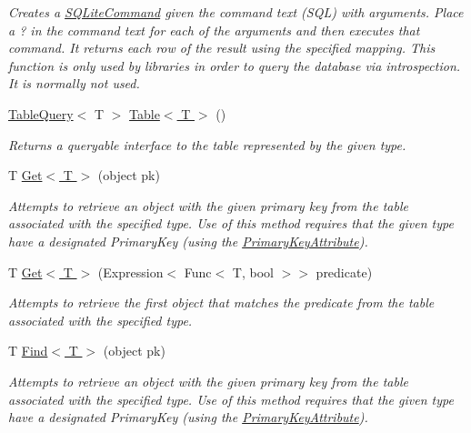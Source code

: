 \begin{DoxyCompactItemize}
\begin{DoxyCompactList}\small\item\em Creates a \hyperlink{classSQLite_1_1SQLiteCommand}{S\+Q\+Lite\+Command} given the command text (S\+Q\+L) with arguments. Place a \textquotesingle{}?\textquotesingle{} in the command text for each of the arguments and then executes that command. It returns each row of the result using the specified mapping. This function is only used by libraries in order to query the database via introspection. It is normally not used. \end{DoxyCompactList}\item 
\hyperlink{classSQLite_1_1TableQuery}{Table\+Query}$<$ T $>$ \hyperlink{classSQLite_1_1SQLiteConnection_ab44d5100216c3cdcea76e45c6f7d6246}{Table$<$ T $>$} ()
\begin{DoxyCompactList}\small\item\em Returns a queryable interface to the table represented by the given type. \end{DoxyCompactList}\item 
T \hyperlink{classSQLite_1_1SQLiteConnection_a17fdec8364635853d573e84530e1ab48}{Get$<$ T $>$} (object pk)
\begin{DoxyCompactList}\small\item\em Attempts to retrieve an object with the given primary key from the table associated with the specified type. Use of this method requires that the given type have a designated Primary\+Key (using the \hyperlink{classSQLite_1_1PrimaryKeyAttribute}{Primary\+Key\+Attribute}). \end{DoxyCompactList}\item 
T \hyperlink{classSQLite_1_1SQLiteConnection_a4034d4b62385b2ab7451c5404ffb5efa}{Get$<$ T $>$} (Expression$<$ Func$<$ T, bool $>$$>$ predicate)
\begin{DoxyCompactList}\small\item\em Attempts to retrieve the first object that matches the predicate from the table associated with the specified type. \end{DoxyCompactList}\item 
T \hyperlink{classSQLite_1_1SQLiteConnection_adfe66fe8c304aca8575f07fc1c05d9f5}{Find$<$ T $>$} (object pk)
\begin{DoxyCompactList}\small\item\em Attempts to retrieve an object with the given primary key from the table associated with the specified type. Use of this method requires that the given type have a designated Primary\+Key (using the \hyperlink{classSQLite_1_1PrimaryKeyAttribute}{Primary\+Key\+Attribute}). \end{DoxyCompactList}\item 
$$
\end{DoxyCompactItemize}
